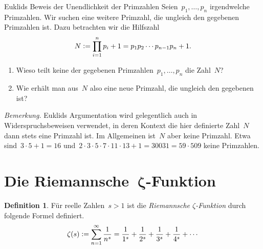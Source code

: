 \documentclass[twoside]{../zirkelblatt1415}
\theoremstyle{definition}
\newtheorem{defn}{Definition}[section]
\theoremstyle{plain}
\theoremstyle{remark}
\newcommand{\defeq}{\vcentcolon=}
\begin{document}
\begin{aufgabe}{Euklids Beweis der Unendlichkeit der Primzahlen}
\label{aufg:unendlich-euklid}
Seien~$p_1,\ldots,p_n$ irgendwelche Primzahlen. Wir suchen eine weitere
Primzahl, die ungleich den gegebenen Primzahlen ist. Dazu betrachten wir die
Hilfszahl
\[ N \defeq \prod_{i=1}^n p_i + 1 = p_1 p_2 \cdots p_{n-1} p_n + 1. \]
\begin{enumerate}
\item Wieso teilt keine der gegebenen Primzahlen~$p_1,\ldots,p_n$ die Zahl~$N$?
\item Wie erhält man aus~$N$ also eine neue Primzahl, die ungleich den
gegebenen ist?
\end{enumerate}

\emph{Bemerkung.} Euklids Argumentation wird gelegentlich auch in
Widerspruchsbeweisen verwendet, in deren Kontext die hier definierte Zahl~$N$
dann stets eine Primzahl ist. Im Allgemeinen ist~$N$ aber keine Primzahl. Etwa
sind~$3 \cdot 5 + 1 = 16$ und~$2 \cdot 3 \cdot 5 \cdot 7 \cdot 11 \cdot 13 + 1
= 30031 = 59 \cdot 509$ keine Primzahlen.
\end{aufgabe}


\section{\texorpdfstring{Die Riemannsche~$\boldsymbol{\zeta}$-Funktion}{Die
Riemannsche~ζ-Funktion}}

\begin{defn}Für reelle Zahlen~$s > 1$ ist die \emph{Riemannsche
$\zeta$-Funktion} durch folgende Formel definiert.
\[ \zeta(s) \defeq \sum_{n=1}^\infty \frac{1}{n^s} =
  \frac{1}{1^s} + \frac{1}{2^s} + \frac{1}{3^s} + \frac{1}{4^s} + \cdots \]
\end{defn}
\end{document}
